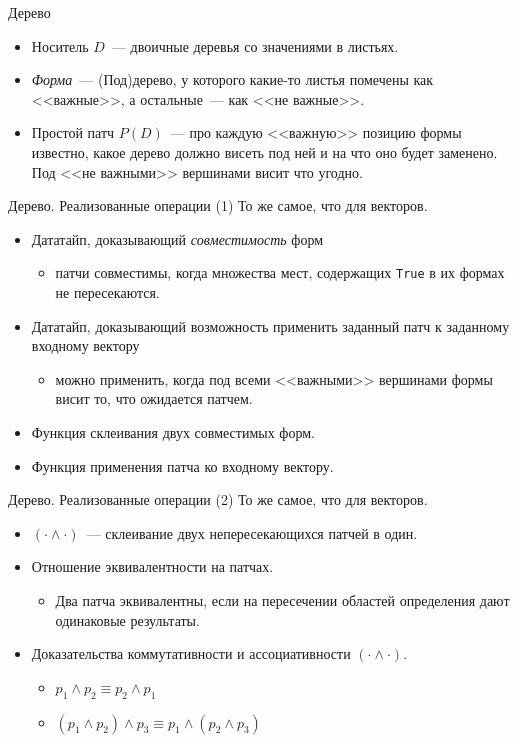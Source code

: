 \begin{frame}{Дерево}
  \begin{itemize}
  \item Носитель $D$~--- двоичные деревья со значениями в листьях.
  \item \emph{Форма}~--- (Под)дерево, у которого какие-то листья
    помечены как <<важные>>, а остальные~--- как <<не важные>>.
  \item Простой патч $P(D)$~--- про каждую <<важную>> позицию формы
    известно, какое дерево должно висеть под ней и на что оно будет
    заменено. Под <<не важными>> вершинами висит что угодно.
  \end{itemize}
\end{frame}

\begin{frame}{Дерево. Реализованные операции (1)}
  То же самое, что для векторов.
  \begin{itemize}
  \item Дататайп, доказывающий \emph{совместимость} форм
    \begin{itemize}
    \item патчи совместимы, когда множества мест, содержащих
      \texttt{True} в их формах не пересекаются.
    \end{itemize}
  \item Дататайп, доказывающий возможность применить заданный патч к
    заданному входному вектору
    \begin{itemize}
    \item можно применить, когда под всеми <<важными>> вершинами формы
      висит то, что ожидается патчем.
    \end{itemize}
  \item Функция склеивания двух совместимых форм.
  \item Функция применения патча ко входному вектору.
  \end{itemize}
\end{frame}

\begin{frame}{Дерево. Реализованные операции (2)}
  То же самое, что для векторов.
  \begin{itemize}
  \item $(\cdot \wedge \cdot)$~--- склеивание двух непересекающихся
    патчей в один.
  \item Отношение эквивалентности на патчах.
    \begin{itemize}
    \item Два патча эквивалентны, если на пересечении областей
      определения дают одинаковые результаты.
    \end{itemize}
  \item Доказательства коммутативности и ассоциативности $(\cdot
    \wedge \cdot)$.
    \begin{itemize}
    \item $p_1 \wedge p_2 \equiv p_2 \wedge p_1$
    \item $(p_1 \wedge p_2) \wedge p_3 \equiv p_1 \wedge (p_2 \wedge p_3)$
    \end{itemize}
  \end{itemize}
\end{frame}

